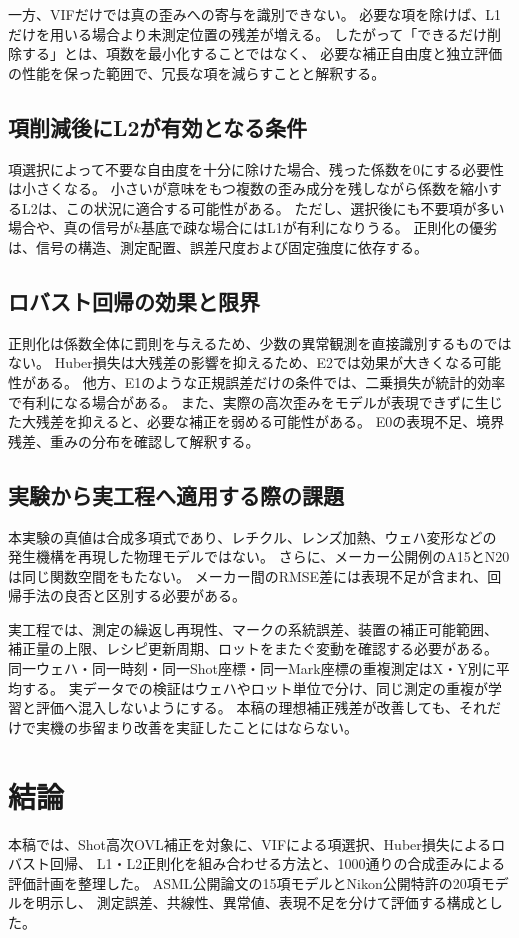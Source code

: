 \documentclass[11pt,a4paper]{ltjsarticle}
\begin{document}
一方、VIFだけでは真の歪みへの寄与を識別できない。
必要な項を除けば、L1だけを用いる場合より未測定位置の残差が増える。
したがって「できるだけ削除する」とは、項数を最小化することではなく、
必要な補正自由度と独立評価の性能を保った範囲で、冗長な項を減らすことと解釈する。

\subsection{項削減後にL2が有効となる条件}
項選択によって不要な自由度を十分に除けた場合、残った係数を0にする必要性は小さくなる。
小さいが意味をもつ複数の歪み成分を残しながら係数を縮小するL2は、この状況に適合する可能性がある。
ただし、選択後にも不要項が多い場合や、真の信号が$k$基底で疎な場合にはL1が有利になりうる。
正則化の優劣は、信号の構造、測定配置、誤差尺度および固定強度に依存する。

\subsection{ロバスト回帰の効果と限界}
正則化は係数全体に罰則を与えるため、少数の異常観測を直接識別するものではない。
Huber損失は大残差の影響を抑えるため、E2では効果が大きくなる可能性がある。
他方、E1のような正規誤差だけの条件では、二乗損失が統計的効率で有利になる場合がある。
また、実際の高次歪みをモデルが表現できずに生じた大残差を抑えると、必要な補正を弱める可能性がある。
E0の表現不足、境界残差、重みの分布を確認して解釈する。

\subsection{実験から実工程へ適用する際の課題}
本実験の真値は合成多項式であり、レチクル、レンズ加熱、ウェハ変形などの
発生機構を再現した物理モデルではない。
さらに、メーカー公開例のA15とN20は同じ関数空間をもたない。
メーカー間のRMSE差には表現不足が含まれ、回帰手法の良否と区別する必要がある。

実工程では、測定の繰返し再現性、マークの系統誤差、装置の補正可能範囲、
補正量の上限、レシピ更新周期、ロットをまたぐ変動を確認する必要がある。
同一ウェハ・同一時刻・同一Shot座標・同一Mark座標の重複測定はX・Y別に平均する。
実データでの検証はウェハやロット単位で分け、同じ測定の重複が学習と評価へ混入しないようにする。
本稿の理想補正残差が改善しても、それだけで実機の歩留まり改善を実証したことにはならない。

\section{結論}
本稿では、Shot高次OVL補正を対象に、VIFによる項選択、Huber損失によるロバスト回帰、
L1・L2正則化を組み合わせる方法と、1000通りの合成歪みによる評価計画を整理した。
ASML公開論文の15項モデルとNikon公開特許の20項モデルを明示し、
測定誤差、共線性、異常値、表現不足を分けて評価する構成とした。
\end{document}
